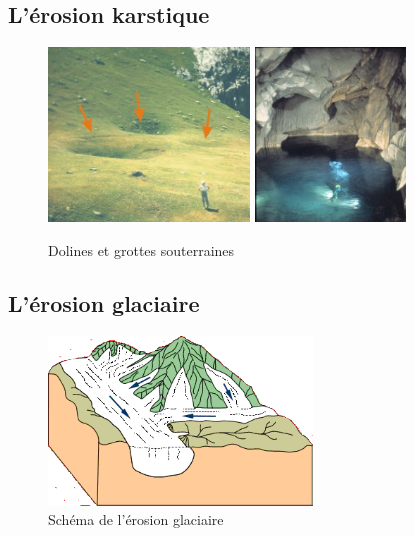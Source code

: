 \documentclass{beamer}
\begin{document}
\subsection{L'érosion karstique}
\begin{frame}
  \begin{center}
    \begin{figure}[h]
      \includegraphics[width=5.35cm]{Images/Diapos/Erosion/Karstique/dolines.jpg}
      \includegraphics[width=4cm]{Images/Diapos/Erosion/Karstique/erosion-karstique-fig04.jpg}
      \caption{Dolines et grottes souterraines}
    \end{figure}
  \end{center}
\end{frame}

\subsection{L'érosion glaciaire}
\begin{frame}
  \begin{center}
    \begin{figure}
      \includegraphics[width=7cm]{Images/Diapos/Erosion/Glaciaire/Erosion_glaciaire_Bourque4B.png}
      \caption{Schéma de l'érosion glaciaire}
    \end{figure}
  \end{center}
\end{frame}
\end{document}
